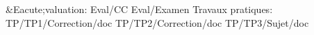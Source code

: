 &Eacute;valuation: Eval/CC Eval/Examen 
Travaux pratiques: TP/TP1/Correction/doc TP/TP2/Correction/doc TP/TP3/Sujet/doc
